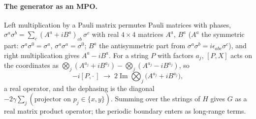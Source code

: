 \paragraph{The generator as an MPO.} Left multiplication by a Pauli matrix permutes Pauli matrices with phases, $\sigma^a\sigma^b = \sum_c (A^a + iB^a)_{cb}\,\sigma^c$ with real $4\times4$ matrices $A^a$, $B^a$ ($A^a$ the symmetric part: $\sigma^a\sigma^0 = \sigma^a$, $\sigma^a\sigma^a = \sigma^0$; $B^a$ the antisymmetric part from $\sigma^a\sigma^b = i\epsilon_{abc}\sigma^c$), and right multiplication gives $A^a - iB^a$. For a string $P$ with factors $a_j$, $[P, X]$ acts on the coordinates as $\bigotimes_j(A^{a_j} + iB^{a_j}) - \bigotimes_j(A^{a_j} - iB^{a_j})$, so
\begin{equation}
-i[P,\cdot\,] \;\longrightarrow\; 2\operatorname{Im}\bigotimes_j\big(A^{a_j} + iB^{a_j}\big),
\end{equation}
a real operator, and the dephasing is the diagonal $-2\gamma\sum_j(\text{projector on } p_j \in \{x, y\})$. Summing over the strings of $H$ gives $G$ as a real matrix product operator; the periodic boundary enters as long-range terms.

